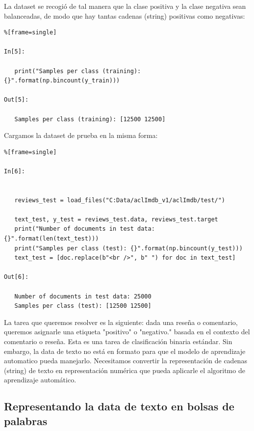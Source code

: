 La dataset se recogió de tal manera que la clase positiva y la clase negativa sean balanceadas, de modo que hay tantas cadenas (string) positivas como negativas: 


\begin{lstlisting}%[frame=single]

In[5]:

   print("Samples per class (training): {}".format(np.bincount(y_train)))

Out[5]:
 
   Samples per class (training): [12500 12500] 
 \end{lstlisting}  
   
     Cargamos la dataset de prueba en la misma forma:
     
\begin{lstlisting}%[frame=single]

In[6]:

     
   reviews_test = load_files("C:Data/aclImdb_v1/aclImdb/test/") 
      
   text_test, y_test = reviews_test.data, reviews_test.target
   print("Number of documents in test data: {}".format(len(text_test)))
   print("Samples per class (test): {}".format(np.bincount(y_test)))
   text_test = [doc.replace(b"<br />", b" ") for doc in text_test]

Out[6]:

   Number of documents in test data: 25000
   Samples per class (test): [12500 12500]

\end{lstlisting}

La tarea que queremos resolver es la siguiente: dada una reseña o comentario, queremos 
asignarle una etiqueta  "{}positivo"{}  o  "{}negativo."{} basada en el contexto del comentario o 
reseña. Esta es una tarea de clasificación binaria estándar. Sin embargo, la data de texto
no está en formato para que el modelo de aprendizaje automatico pueda manejarlo.
Necesitamos convertir la representación de  cadenas (string) de texto  en representación 
numérica que pueda aplicarle el algoritmo de aprendizaje automático.

\subsection{Representando la data de texto en bolsas de palabras}

 
